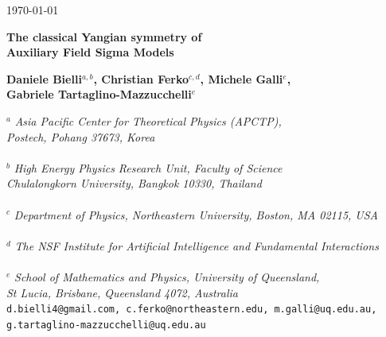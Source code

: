 \documentclass[12pt]{article}
\numberwithin{equation}{section}
\begin{document}
\begin{titlepage}
\begin{flushright}
\today
\end{flushright}
\vspace{5mm}



\begin{center}
{\Large \bf 
The classical Yangian symmetry of
\\
Auxiliary Field Sigma Models
}
\end{center}

\begin{center}

{\bf
Daniele Bielli${}^{a,b}$,
Christian Ferko${}^{c,d}$,
Michele Galli${}^{e}$,\\
Gabriele Tartaglino-Mazzucchelli${}^{e}$
} \\
\vspace{5mm}

\footnotesize{
${}^{a}$
{\it 
Asia Pacific Center for Theoretical Physics (APCTP), \\ 
Postech, Pohang 37673, 
Korea}
 \\~\\
${}^{b}$
{\it 
High Energy Physics Research Unit, Faculty of Science \\ 
Chulalongkorn University, Bangkok 10330, Thailand
}
 \\~\\
${}^{c}$
{\it 
Department of Physics, Northeastern University, Boston, MA 02115, USA
}
 \\~\\
${}^{d}$
{\it 
The NSF Institute for Artificial Intelligence
and Fundamental Interactions
}
  \\~\\
${}^{e}$
{\it 
School of Mathematics and Physics, University of Queensland,
\\
 St Lucia, Brisbane, Queensland 4072, Australia}
}
\vspace{6mm}
~\\
\texttt{d.bielli4@gmail.com,
c.ferko@northeastern.edu,
m.galli@uq.edu.au,
g.tartaglino-mazzucchelli@uq.edu.au
}\\
\vspace{2mm}


\end{center}


\end{titlepage}
\end{document}
